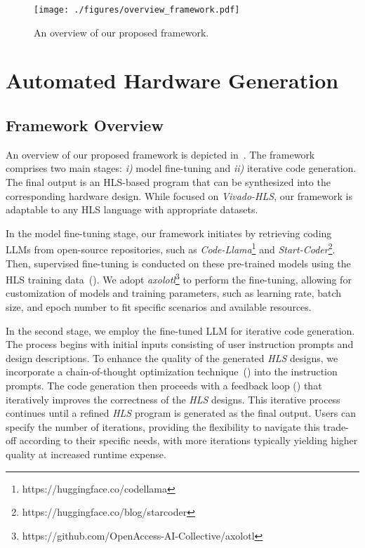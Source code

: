 \begin{figure*}[htb]
\centering
\texttt{[image: ./figures/overview\_framework.pdf]}
\vspace{-3mm}
\caption{An overview of our proposed framework.}
\vspace{-3mm}
\label{fig:overview}
\end{figure*}


\section{Automated Hardware Generation}\label{subsec:hwgen}


\subsection{Framework Overview}\label{subsec:hwgen_overview}
An overview of our proposed framework is depicted in~.
The framework comprises two main stages: \textit{i)} model fine-tuning and \textit{ii)} iterative code generation. The final output is an HLS-based program that can be synthesized into the corresponding hardware design. While focused on \textit{Vivado-HLS}, our framework is adaptable to any HLS language with appropriate datasets.

In the model fine-tuning stage, our framework initiates by retrieving coding LLMs from open-source repositories, such as \textit{Code-Llama}\footnote{https://huggingface.co/codellama} and \textit{Start-Coder}\footnote{https://huggingface.co/blog/starcoder}.
Then, supervised fine-tuning is conducted on these pre-trained models using the HLS training data~().
We adopt \textit{axolotl}\footnote{https://github.com/OpenAccess-AI-Collective/axolotl} to perform the fine-tuning, allowing for customization of models and training parameters, such as learning rate, batch size, and epoch number to fit specific scenarios and available resources.

In the second stage,
we employ the fine-tuned LLM for iterative code generation.
The process begins with initial inputs consisting of user instruction prompts and design descriptions. To enhance the quality of the generated \textit{HLS} designs, we incorporate a chain-of-thought optimization technique~() into the instruction prompts.
The code generation then proceeds with a feedback loop () that iteratively improves the correctness of the \textit{HLS} designs.
This iterative process continues until a refined \textit{HLS} program is generated as the final output. 
Users can specify the number of iterations, providing the flexibility to navigate this trade-off according to their specific needs, with more iterations typically yielding higher quality at increased runtime expense.


